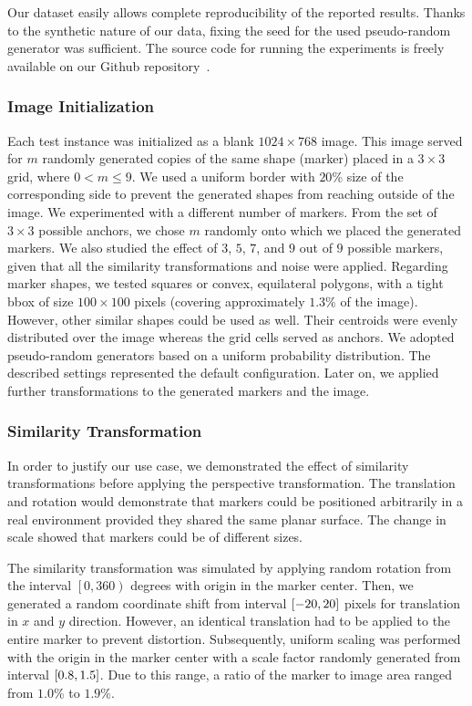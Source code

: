 Our dataset easily allows complete reproducibility of the reported results. Thanks to the synthetic nature of our data, fixing the seed for the used pseudo-random generator was sufficient. The source code for running the experiments is freely available on our Github repository~\cite{webhomographyrankinggithub}.

\subsubsection{Image Initialization}

Each test instance was initialized as a blank $1024 \times 768$ image. This image served for $m$ randomly generated copies of the same shape (marker) placed in a $3 \times 3$ grid, where $0 < m \leq 9$. We used a uniform border with $20$\% size of the corresponding side to prevent the generated shapes from reaching outside of the image. We experimented with a different number of markers. From the set of $3 \times 3$ possible anchors, we chose $m$ randomly onto which we placed the generated markers. We also studied the effect of $3$, $5$, $7$, and $9$ out of $9$ possible markers, given that all the similarity transformations and noise were applied. Regarding marker shapes, we tested squares or convex, equilateral polygons, with a tight \gls{bbox} of size $100 \times 100$ pixels (covering approximately $1.3$\% of the image). However, other similar shapes could be used as well. Their centroids were evenly distributed over the image whereas the grid cells served as anchors. We adopted pseudo-random generators based on a uniform probability distribution. The described settings represented the default configuration. Later on, we applied further transformations to the generated markers and the image.

\subsubsection{Similarity Transformation}

In order to justify our use case, we demonstrated the effect of similarity transformations before applying the perspective transformation. The translation and rotation would demonstrate that markers could be positioned arbitrarily in a real environment provided they shared the same planar surface. The change in scale showed that markers could be of different sizes.

The similarity transformation was simulated by applying random rotation from the interval $\left[0, 360\right)$ degrees with origin in the marker center. Then, we generated a random coordinate shift from interval $\left[ {-20, 20} \right]$ pixels for translation in $x$ and $y$ direction. However, an identical translation had to be applied to the entire marker to prevent distortion. Subsequently, uniform scaling was performed with the origin in the marker center with a scale factor randomly generated from interval $\left[ {0.8, 1.5} \right]$. Due to this range, a ratio of the marker to image area ranged from $1.0$\% to $1.9$\%.

